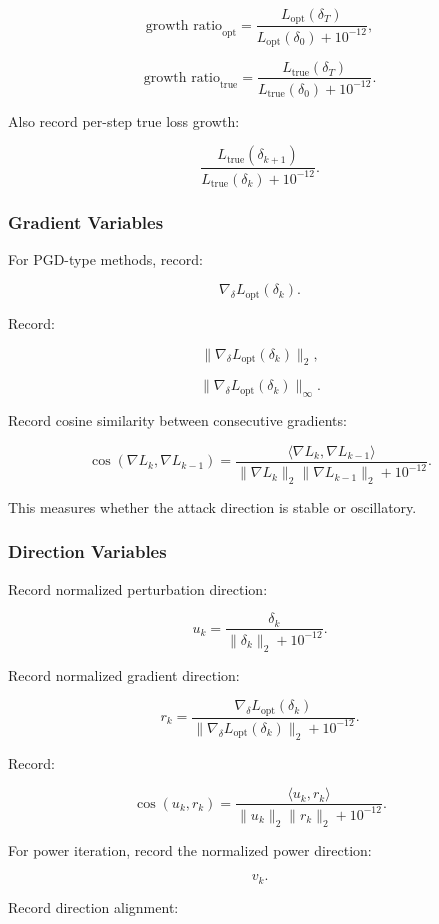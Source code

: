 \documentclass{article}
\begin{document}
\[
\text{growth ratio}_{\mathrm{opt}}
=
\frac{
L_{\mathrm{opt}}(\delta_T)
}{
L_{\mathrm{opt}}(\delta_0)+10^{-12}
},
\]

\[
\text{growth ratio}_{\mathrm{true}}
=
\frac{
L_{\mathrm{true}}(\delta_T)
}{
L_{\mathrm{true}}(\delta_0)+10^{-12}
}.
\]

Also record per-step true loss growth:

\[
\frac{
L_{\mathrm{true}}(\delta_{k+1})
}{
L_{\mathrm{true}}(\delta_k)+10^{-12}
}.
\]

\subsubsection{Gradient Variables}

For PGD-type methods, record:

\[
\nabla_\delta L_{\mathrm{opt}}(\delta_k).
\]

Record:

\[
\|\nabla_\delta L_{\mathrm{opt}}(\delta_k)\|_2,
\]

\[
\|\nabla_\delta L_{\mathrm{opt}}(\delta_k)\|_\infty.
\]

Record cosine similarity between consecutive gradients:

\[
\cos(\nabla L_k,\nabla L_{k-1})
=
\frac{
\langle \nabla L_k,\nabla L_{k-1}\rangle
}{
\|\nabla L_k\|_2\|\nabla L_{k-1}\|_2+10^{-12}
}.
\]

This measures whether the attack direction is stable or oscillatory.

\subsubsection{Direction Variables}

Record normalized perturbation direction:

\[
u_k
=
\frac{\delta_k}{\|\delta_k\|_2+10^{-12}}.
\]

Record normalized gradient direction:

\[
r_k
=
\frac{
\nabla_\delta L_{\mathrm{opt}}(\delta_k)
}{
\|\nabla_\delta L_{\mathrm{opt}}(\delta_k)\|_2+10^{-12}
}.
\]

Record:

\[
\cos(u_k,r_k)
=
\frac{
\langle u_k,r_k\rangle
}{
\|u_k\|_2\|r_k\|_2+10^{-12}
}.
\]

For power iteration, record the normalized power direction:

\[
v_k.
\]

Record direction alignment:
\end{document}
